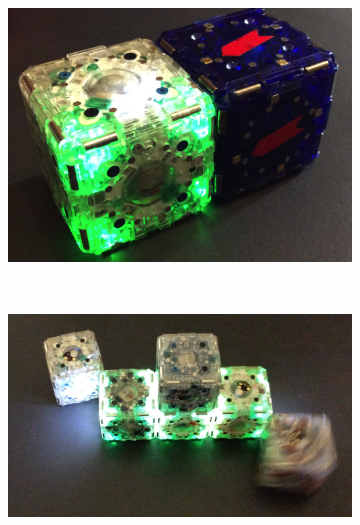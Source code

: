 \begin{figure}[t]
	\centering
	\begin{subfigure}[b]{1.6 in}
		\includegraphics[width=.9\linewidth]{Figures/mTagsCover.png}
		\subcaption{}
	\end{subfigure}
	~
	\begin{subfigure}[b]{1.5 in}
		
		
		\resizebox{1.5 in}{1.25 in}
		{
			\begin{tikzpicture}[x=(220:1cm), y=(-40:1cm), z=(90:0.707cm)]
			
			
			
			\end{tikzpicture}
		}
		
		\subcaption{}
	\end{subfigure}
	
	\begin{subfigure}[b]{\linewidth}

		\centering
		\includegraphics[width=.92\linewidth]{figures/ActualLine_3.png}


\end{subfigure}
\end{figure}
